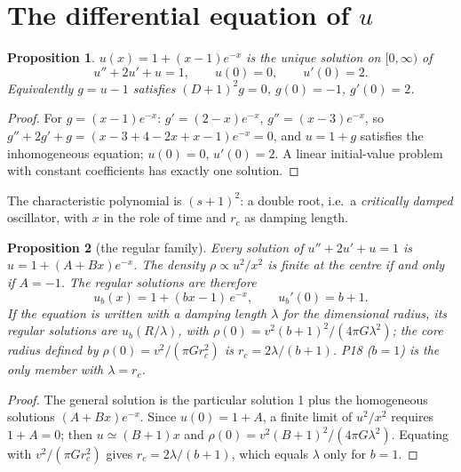 \documentclass[11pt,a4paper]{article}
\newtheorem{proposition}{Proposition}
\theoremstyle{definition}
\theoremstyle{remark}
\newcommand{\rc}{r_c}
\begin{document}
\section{The differential equation of $u$}\label{sec:ode}

\begin{proposition}\label{prop:ode}
$u(x)=1+(x-1)e^{-x}$ is the unique solution on $[0,\infty)$ of
\begin{equation}
  u''+2u'+u=1,\qquad u(0)=0,\qquad u'(0)=2.
  \label{eq:ode}
\end{equation}
Equivalently $g=u-1$ satisfies $(D+1)^2g=0$, $g(0)=-1$, $g'(0)=2$.
\end{proposition}
\begin{proof}
For $g=(x-1)e^{-x}$: $g'=(2-x)e^{-x}$, $g''=(x-3)e^{-x}$, so
$g''+2g'+g=(x-3+4-2x+x-1)e^{-x}=0$, and $u=1+g$ satisfies the inhomogeneous equation;
$u(0)=0$, $u'(0)=2$. A linear initial-value problem with constant coefficients has exactly one
solution.
\end{proof}

The characteristic polynomial is $(s+1)^2$: a double root, i.e.\ a \emph{critically damped}
oscillator, with $x$ in the role of time and $\rc$ as damping length.

\begin{proposition}[the regular family]\label{prop:family}
Every solution of $u''+2u'+u=1$ is $u=1+(A+Bx)e^{-x}$. The density $\rho\propto u^2/x^2$ is
finite at the centre if and only if $A=-1$. The regular solutions are therefore
\begin{equation}
  u_b(x)=1+(bx-1)\,e^{-x},\qquad u_b'(0)=b+1 .
  \label{eq:family}
\end{equation}
If the equation is written with a damping length $\lambda$ for the dimensional radius, its
regular solutions are $u_b(R/\lambda)$, with $\rho(0)=v^2(b+1)^2/(4\pi G\lambda^2)$; the core
radius defined by $\rho(0)=v^2/(\pi G\rc^2)$ is $\rc=2\lambda/(b+1)$. P18 ($b=1$) is the only
member with $\lambda=\rc$.
\end{proposition}
\begin{proof}
The general solution is the particular solution 1 plus the homogeneous solutions
$(A+Bx)e^{-x}$. Since $u(0)=1+A$, a finite limit of $u^2/x^2$ requires $1+A=0$; then
$u\simeq(B+1)x$ and $\rho(0)=v^2(B+1)^2/(4\pi G\lambda^2)$. Equating with
$v^2/(\pi G\rc^2)$ gives $\rc=2\lambda/(b+1)$, which equals $\lambda$ only for $b=1$.
\end{proof}
\end{document}
